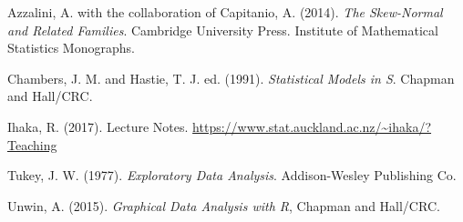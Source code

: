 \documentclass[12pt]{article}
\begin{document}
\begin{description}\itemsep-4pt

\item
Azzalini, A. with the collaboration of Capitanio, A. (2014). 
\textit{The Skew-Normal and Related Families}. 
Cambridge University Press. 
Institute of Mathematical Statistics Monographs.

\item
Chambers, J. M. and Hastie,  T. J. ed. (1991).
\textit{Statistical Models in S}. 
Chapman and Hall/CRC. 

\item
Ihaka, R. (2017). Lecture Notes. 
\url{https://www.stat.auckland.ac.nz/~ihaka/?Teaching}

\item
Tukey, J. W. (1977).
\textit{Exploratory Data Analysis}. 
Addison-Wesley Publishing Co.

\item
Unwin, A. (2015). 
\textit{Graphical Data Analysis with R}, 
Chapman and Hall/CRC. 
\end{description}
\end{document}
